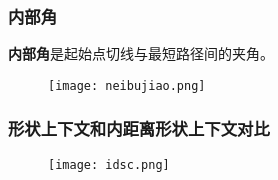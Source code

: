 \documentclass[notheorems,mathserif,table,compress]{beamer}  %
\begin{document}
\begin{frame}
\frametitle{内部角}
{\color{blue}\textbf{内部角}}是起始点切线与最短路径间的夹角。
   \begin{figure}[!ht]
    \centering
    \texttt{[image: neibujiao.png]}
   \end{figure}
\end{frame}   

\begin{frame}
\frametitle{形状上下文和内距离形状上下文对比}
   \begin{figure}[!ht]
    \centering
    \texttt{[image: idsc.png]}
   \end{figure}
\end{frame}   
\end{document}
